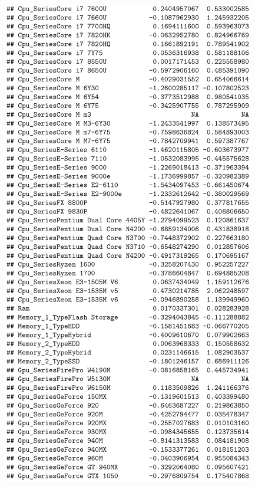 \documentclass[12pt]{article}
\begin{document}
\begin{figure}[h!]
    \centering
    \includegraphics{Model_1_CI(3_5).png}
    \label{fig:CI13}
\end{figure}
\end{document}
